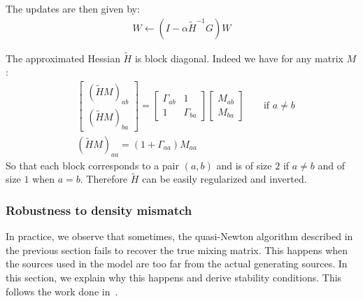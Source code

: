 The updates are then given by:
\begin{align}
  \label{eq:infomaxupdates}
  W \leftarrow (I - \alpha \tilde{H}^{-1} G) W
\end{align}

The approximated Hessian $\tilde{H}$ is block diagonal.
Indeed we have for any matrix $M$:
\begin{align}
  &\begin{bmatrix} (\tilde{H} M)_{ab} \\  (\tilde{H} M)_{ba} \end{bmatrix} = \begin{bmatrix} \Gamma_{ab} & 1 \\ 1 & \Gamma_{ba} \end{bmatrix} \begin{bmatrix} M_{ab} \\ M_{ba} \end{bmatrix} && \text{ if } a \neq b  \nonumber \\
  &(\tilde{H} M)_{aa} =  (1 + \Gamma_{aa}) M_{aa}
 \label{eq:apphess:blocks}
\end{align}
So that each block corresponds to a pair $(a, b)$ and is of size $2$ if $a \neq b$ and of size $1$ when $a=b$.
Therefore $\tilde{H}$ can be easily regularized and inverted.

\subsubsection{Robustness to density mismatch}
In practice, we observe that sometimes, the quasi-Newton algorithm described in
the previous section fails to recover the true mixing matrix. This happens when the
sources used in the model are too far from the actual  generating sources.
%
In this section, we explain
why this happens and derive stability conditions. This follows the work done in~\cite{cardoso1998blind}.


